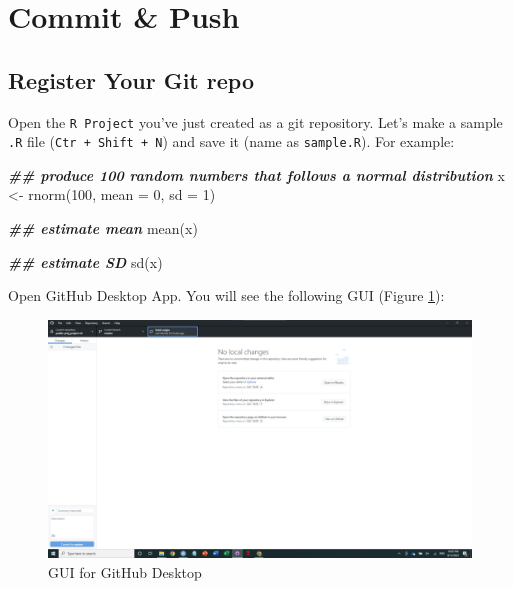 \documentclass[
]{book}
\newenvironment{Shaded}{\begin{snugshade}}{\end{snugshade}}
\newcommand{\AttributeTok}[1]{\textcolor[rgb]{0.77,0.63,0.00}{#1}}
\newcommand{\DecValTok}[1]{\textcolor[rgb]{0.00,0.00,0.81}{#1}}
\newcommand{\DocumentationTok}[1]{\textcolor[rgb]{0.56,0.35,0.01}{\textbf{\textit{#1}}}}
\newcommand{\FunctionTok}[1]{\textcolor[rgb]{0.00,0.00,0.00}{#1}}
\newcommand{\NormalTok}[1]{#1}
\newcommand{\OtherTok}[1]{\textcolor[rgb]{0.56,0.35,0.01}{#1}}
\begin{document}
\hypertarget{commit-push}{%
\section{Commit \& Push}\label{commit-push}}

\hypertarget{register-your-git-repo}{%
\subsection{Register Your Git repo}\label{register-your-git-repo}}

Open the \texttt{R\ Project} you've just created as a git repository. Let's make a sample \texttt{.R} file (\texttt{Ctr\ +\ Shift\ +\ N}) and save it (name as \texttt{sample.R}). For example:

\begin{Shaded}
\begin{Highlighting}[]
\DocumentationTok{\#\# produce 100 random numbers that follows a normal distribution}
\NormalTok{x }\OtherTok{\textless{}{-}} \FunctionTok{rnorm}\NormalTok{(}\DecValTok{100}\NormalTok{, }\AttributeTok{mean =} \DecValTok{0}\NormalTok{, }\AttributeTok{sd =} \DecValTok{1}\NormalTok{)}

\DocumentationTok{\#\# estimate mean}
\FunctionTok{mean}\NormalTok{(x)}

\DocumentationTok{\#\# estimate SD}
\FunctionTok{sd}\NormalTok{(x)}
\end{Highlighting}
\end{Shaded}

Open GitHub Desktop App. You will see the following GUI (Figure \ref{fig:gitdesktop1}):

\begin{figure}

{\centering \includegraphics[width=61.11in]{image/git_image02} 

}

\caption{GUI for GitHub Desktop}\label{fig:gitdesktop1}
\end{figure}
\end{document}
